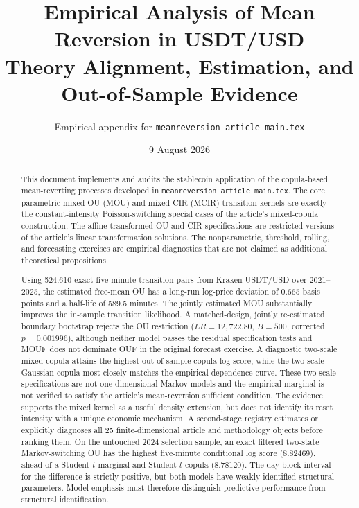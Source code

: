 \documentclass[11pt]{article}
\title{Empirical Analysis of Mean Reversion in USDT/USD\\
\large Theory Alignment, Estimation, and Out-of-Sample Evidence}
\author{Empirical appendix for \texttt{meanreversion\_article\_main.tex}}
\date{9 August 2026}
\newcommand{\1}{\mathbf{1}}
\begin{document}
\maketitle

\begin{abstract}
This document implements and audits the stablecoin application of the copula-based
mean-reverting processes developed in \texttt{meanreversion\_article\_main.tex}.
The core parametric mixed-OU (MOU) and mixed-CIR (MCIR) transition kernels are
exactly the constant-intensity Poisson-switching special cases of the article's
mixed-copula construction.  The affine transformed OU and CIR specifications are
restricted versions of the article's linear transformation solutions.  The
nonparametric, threshold, rolling, and forecasting exercises are empirical
diagnostics that are not claimed as additional theoretical propositions.

Using 524,610 exact five-minute transition pairs from Kraken USDT/USD over
2021--2025, the estimated free-mean OU has a long-run log-price deviation of
0.665 basis points and a half-life of 589.5 minutes.  The jointly estimated MOU
substantially improves the in-sample transition likelihood.  A matched-design,
jointly re-estimated boundary bootstrap rejects the OU restriction
($LR=12{,}722.80$, $B=500$, corrected $p=0.001996$), although neither model passes
the residual specification tests and MOUF does not dominate OUF in the original
forecast exercise.  A diagnostic two-scale mixed copula attains the highest
out-of-sample copula log score, while the two-scale Gaussian copula most closely
matches the empirical dependence curve.  These two-scale specifications are not
one-dimensional Markov models and the empirical marginal is not verified to
satisfy the article's mean-reversion sufficient condition.  The evidence supports
the mixed kernel as a useful density extension, but does not identify its reset
intensity with a unique economic mechanism.  A second-stage registry estimates
or explicitly diagnoses all 25 finite-dimensional article and methodology
objects before ranking them.  On the untouched 2024 selection sample, an exact
filtered two-state Markov-switching OU has the highest five-minute conditional
log score (8.82469), ahead of a Student-$t$ marginal and Student-$t$ copula
(8.78120).  The day-block interval for the difference is strictly positive, but
both models have weakly identified structural parameters.  Model emphasis must
therefore distinguish predictive performance from structural identification.
\end{abstract}
\end{document}
